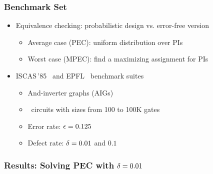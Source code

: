 \begin{frame}
    \frametitle{Benchmark Set}
    \begin{itemize}
        \item Equivalence checking: probabilistic design vs. error-free version
              \pause
              \begin{itemize}
                  \item Average case (PEC): uniform distribution over PIs
                        \pause
                  \item Worst case (MPEC): find a maximizing assignment for PIs
                        \pause
              \end{itemize}
        \item ISCAS\,'85~\cite{ISCAS85-benchmark}
              and EPFL~\cite{EPFL-benchmark} benchmark suites
              \pause
              \begin{itemize}
                  \item And-inverter graphs (AIGs)
                  \item \ncircuit~circuits with sizes from 100 to 100K gates
                        \pause
                  \item Error rate: $\epsilon=0.125$
                        \pause
                  \item Defect rate: $\delta=0.01$ and $0.1$
              \end{itemize}
    \end{itemize}
\end{frame}

\begin{frame}
    \frametitle{Results: Solving PEC with $\delta=0.01$}
    \begin{table}
        \centering
        \tiny
    \end{table}
\end{frame}

